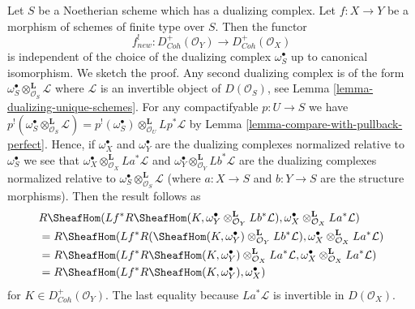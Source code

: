 \begin{remark}
\label{remark-independent-omega-S}
Let $S$ be a Noetherian scheme which has a dualizing complex.
Let $f : X \to Y$ be a morphism of schemes of finite type
over $S$. Then the functor
$$
f_{new}^! : D^+_{Coh}(\mathcal{O}_Y) \to D^+_{Coh}(\mathcal{O}_X)
$$
is independent of the choice of the dualizing complex $\omega_S^\bullet$
up to canonical isomorphism. We sketch the proof. Any second dualizing complex
is of the form $\omega_S^\bullet \otimes_{\mathcal{O}_S}^\mathbf{L} \mathcal{L}$
where $\mathcal{L}$ is an invertible object of $D(\mathcal{O}_S)$, see
Lemma \ref{lemma-dualizing-unique-schemes}.
For any compactifyable $p : U \to S$ we have
$p^!(\omega_S^\bullet \otimes^\mathbf{L}_{\mathcal{O}_S} \mathcal{L}) =
p^!(\omega_S^\bullet) \otimes^\mathbf{L}_{\mathcal{O}_U} Lp^*\mathcal{L}$
by Lemma \ref{lemma-compare-with-pullback-perfect}.
Hence, if $\omega_X^\bullet$ and $\omega_Y^\bullet$ are the
dualizing complexes normalized relative to $\omega_S^\bullet$ we see that
$\omega_X^\bullet \otimes_{\mathcal{O}_X}^\mathbf{L} La^*\mathcal{L}$ and
$\omega_Y^\bullet \otimes_{\mathcal{O}_Y}^\mathbf{L} Lb^*\mathcal{L}$
are the dualizing complexes normalized relative to
$\omega_S^\bullet \otimes_{\mathcal{O}_S}^\mathbf{L} \mathcal{L}$
(where $a : X \to S$ and $b : Y \to S$ are the structure morphisms).
Then the result follows as
\begin{align*}
& R\SheafHom( Lf^*R\SheafHom(K,
\omega_Y^\bullet \otimes_{\mathcal{O}_Y}^\mathbf{L} Lb^*\mathcal{L}),
\omega_X^\bullet \otimes_{\mathcal{O}_X}^\mathbf{L} La^*\mathcal{L}) \\
& = R\SheafHom(Lf^*R(\SheafHom(K,
\omega_Y^\bullet) \otimes_{\mathcal{O}_Y}^\mathbf{L} Lb^*\mathcal{L}),
\omega_X^\bullet \otimes_{\mathcal{O}_X}^\mathbf{L} La^*\mathcal{L}) \\
& = R\SheafHom(Lf^*R\SheafHom(K,
\omega_Y^\bullet) \otimes_{\mathcal{O}_X}^\mathbf{L} La^*\mathcal{L},
\omega_X^\bullet \otimes_{\mathcal{O}_X}^\mathbf{L} La^*\mathcal{L}) \\
& = R\SheafHom(Lf^*R\SheafHom(K, \omega_Y^\bullet), \omega_X^\bullet)
\end{align*}
for $K \in D^+_{Coh}(\mathcal{O}_Y)$.
The last equality because $La^*\mathcal{L}$ is invertible in
$D(\mathcal{O}_X)$.
\end{remark}


